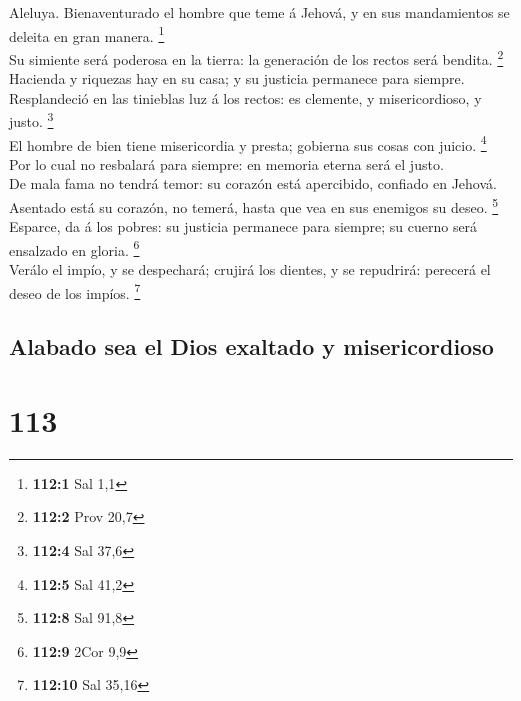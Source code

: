  Aleluya. Bienaventurado el hombre que teme á Jehová, y en
sus mandamientos se deleita en gran manera. \footnote{\textbf{112:1} Sal
  1,1}\\
 Su simiente será poderosa en la tierra: la generación de
los rectos será bendita. \footnote{\textbf{112:2} Prov 20,7}\\
 Hacienda y riquezas hay en su casa; y su justicia
permanece para siempre.\\
 Resplandeció en las tinieblas luz á los rectos: es
clemente, y misericordioso, y justo. \footnote{\textbf{112:4} Sal 37,6}\\
 El hombre de bien tiene misericordia y presta; gobierna
sus cosas con juicio. \footnote{\textbf{112:5} Sal 41,2}\\
 Por lo cual no resbalará para siempre: en memoria eterna
será el justo.\\
 De mala fama no tendrá temor: su corazón está apercibido,
confiado en Jehová.\\
 Asentado está su corazón, no temerá, hasta que vea en sus
enemigos su deseo. \footnote{\textbf{112:8} Sal 91,8}\\
 Esparce, da á los pobres: su justicia permanece para
siempre; su cuerno será ensalzado en gloria. \footnote{\textbf{112:9}
  2Cor 9,9}\\
 Verálo el impío, y se despechará; crujirá los dientes, y
se repudrirá: perecerá el deseo de los impíos. \footnote{\textbf{112:10}
  Sal 35,16}

\hypertarget{alabado-sea-el-dios-exaltado-y-misericordioso}{%
\subsection{Alabado sea el Dios exaltado y
misericordioso}\label{alabado-sea-el-dios-exaltado-y-misericordioso}}

\hypertarget{section-112}{%
\section{113}\label{section-112}}

